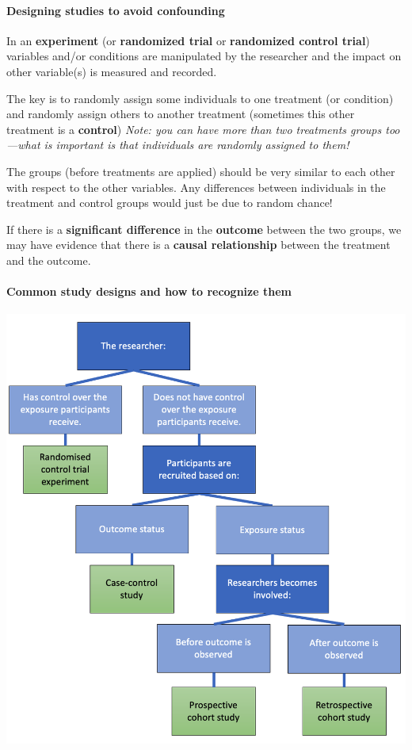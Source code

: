 \documentclass[
  openany]{book}
\begin{document}
\hypertarget{designing-studies-to-avoid-confounding}{%
\paragraph{Designing studies to avoid confounding}\label{designing-studies-to-avoid-confounding}}

In an \textbf{experiment} (or \textbf{randomized trial} or \textbf{randomized control trial}) variables and/or conditions are manipulated by the researcher and the impact on other variable(s) is measured and recorded.

The key is to randomly assign some individuals to one treatment (or condition) and randomly assign others to another treatment (sometimes this other treatment is a \textbf{control}) \emph{Note: you can have more than two treatments groups too---what is important is that individuals are randomly assigned to them!}

The groups (before treatments are applied) should be very similar to each other with respect to the other variables. Any differences between individuals in the treatment and control groups would just be due to random chance!

If there is a \textbf{significant difference} in the \textbf{outcome} between the two groups, we may have evidence that there is a \textbf{causal relationship} between the treatment and the outcome.

\hypertarget{common-study-designs-and-how-to-recognize-them}{%
\paragraph{Common study designs and how to recognize them}\label{common-study-designs-and-how-to-recognize-them}}

\begin{center}\includegraphics[width=0.45\linewidth]{images/m2/studies} \end{center}
\end{document}
